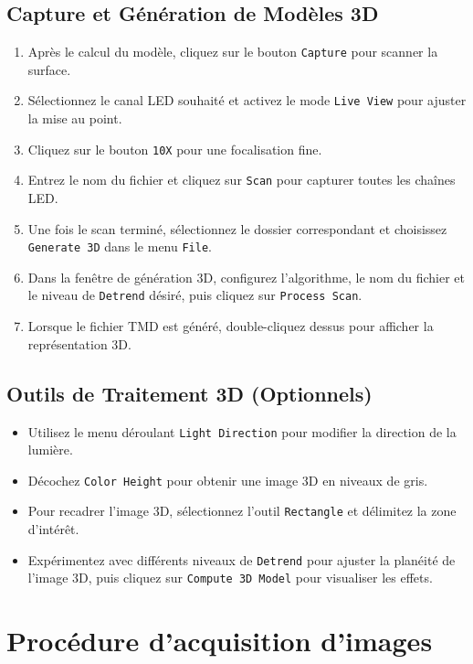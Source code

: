 \documentclass[a4paper,12pt]{article}
\begin{document}
\subsection{Capture et Génération de Modèles 3D}
\begin{enumerate}
  \item Après le calcul du modèle, cliquez sur le bouton \texttt{Capture} pour scanner la surface.
  \item Sélectionnez le canal LED souhaité et activez le mode \texttt{Live View} pour ajuster la mise au point.
  \item Cliquez sur le bouton \texttt{10X} pour une focalisation fine.
  \item Entrez le nom du fichier et cliquez sur \texttt{Scan} pour capturer toutes les chaînes LED.
  \item Une fois le scan terminé, sélectionnez le dossier correspondant et choisissez \texttt{Generate 3D} dans le menu \texttt{File}.
  \item Dans la fenêtre de génération 3D, configurez l'algorithme, le nom du fichier et le niveau de \texttt{Detrend} désiré, puis cliquez sur \texttt{Process Scan}.
  \item Lorsque le fichier TMD est généré, double-cliquez dessus pour afficher la représentation 3D.
\end{enumerate}

\subsection{Outils de Traitement 3D (Optionnels)}
\begin{itemize}
  \item Utilisez le menu déroulant \texttt{Light Direction} pour modifier la direction de la lumière.
  \item Décochez \texttt{Color Height} pour obtenir une image 3D en niveaux de gris.
  \item Pour recadrer l'image 3D, sélectionnez l'outil \texttt{Rectangle} et délimitez la zone d'intérêt.
  \item Expérimentez avec différents niveaux de \texttt{Detrend} pour ajuster la planéité de l'image 3D, puis cliquez sur \texttt{Compute 3D Model} pour visualiser les effets.
\end{itemize}

\section{Procédure d'acquisition d'images}
\end{document}
